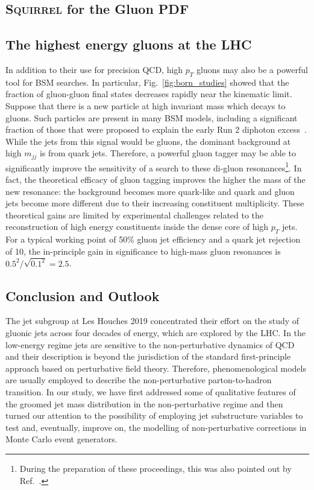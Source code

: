 \documentclass[11pt]{cernrep}
\begin{document}
\subsection{\textsc{Squirrel} for the Gluon PDF}
\label{sec:jets:pdf}



\subsection{The highest energy gluons at the LHC}
\label{sec:jets:highest}

In addition to their use for precision QCD, high $p_T$ gluons may also be a powerful tool for BSM searches.  In particular, Fig.~\ref{fig:born_studies} showed that the fraction of gluon-gluon final states decreases rapidly near the kinematic limit.  Suppose that there is a new particle at high invariant mass which decays to gluons.  Such particles are present in many BSM models, including a significant fraction of those that were proposed to explain the early Run 2 diphoton excess~\cite{Khachatryan:2016hje,Aaboud:2016tru}.  While the jets from this signal would be gluons, the dominant background at high $m_{jj}$ is from quark jets.  Therefore, a powerful gluon tagger may be able to significantly improve the sensitivity of a search to these di-gluon resonances\footnote{During the preparation of these proceedings, this was also pointed out by Ref.~\cite{Nayak:2019quy}.}.  In fact, the theoretical efficacy of gluon tagging improves the higher the mass of the new resonance: the background becomes more quark-like and quark and gluon jets become more different due to their increasing constituent multiplicity.  These theoretical gains are limited by experimental challenges related to the reconstruction of high energy constituents inside the dense core of high $p_T$ jets.  For a typical working point of 50\% gluon jet efficiency and a quark jet rejection of 10, the in-principle gain in significance to high-mass gluon resonances is $0.5^2/\sqrt{0.1^2}=2.5$.

\subsection{Conclusion and Outlook}
\label{sec:jets:conclusion}
The jet subgroup at Les Houches 2019 concentrated their effort on the study of gluonic jets across four decades of energy, which are explored by the LHC. 
%
In the low-energy regime jets are sensitive to the non-perturbative dynamics of QCD and their description is beyond the jurisdiction of the standard first-principle approach based on perturbative field theory. Therefore, phenomenological models are usually employed to describe the non-perturbative parton-to-hadron transition. 
%
In our study, we have first addressed some of qualitative features of the groomed jet mass distribution in the non-perturbative regime and then turned our attention to the possibility of employing jet substructure variables to test and, eventually, improve on, the modelling of non-perturbative corrections in Monte Carlo event generators. 
\end{document}
